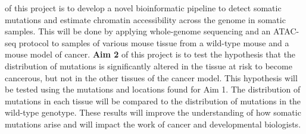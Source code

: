 \documentclass[12pt]{article}
\begin{document}
 of this project is to develop a novel bioinformatic pipeline to detect somatic mutations and estimate chromatin accessibility across the genome in somatic samples.
This will be done by applying whole-genome sequencing and an ATAC-seq protocol to samples of various mouse tissue from a wild-type mouse and a mouse model of cancer.
\textbf{Aim 2} of this project is to test the hypothesis that the distribution of mutations is significantly altered in the tissue at risk to become cancerous, but not in the other tissues of the cancer model.
This hypothesis will be tested using the mutations and locations found for Aim 1.
The distribution of mutations in each tissue will be compared to the distribution of mutations in the wild-type genotype.
These results will improve the understanding of how somatic mutations arise and will impact the work of cancer and developmental biologists.
\end{document}
